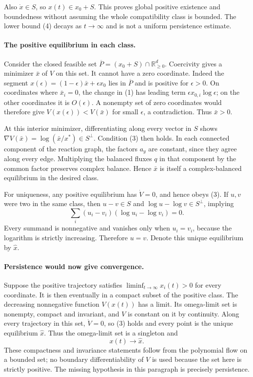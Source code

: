 \documentclass[11pt]{article}
\begin{document}
Also $\dot x\in S$, so $x(t)\in x_0+S$.
This proves global positive existence and boundedness without assuming
the whole compatibility class is bounded. The lower bound (4) decays
as $t\to\infty$ and is not a uniform persistence estimate.

\paragraph{The positive equilibrium in each class.}
Consider the closed feasible set
$\overline P=(x_0+S)\cap\mathbb R_{\ge0}^d$.
Coercivity gives a minimizer $\bar x$ of $V$ on this set.
It cannot have a zero coordinate. Indeed the segment
$x(\epsilon)=(1-\epsilon)\bar x+\epsilon x_0$ lies in $\overline P$
and is positive for $\epsilon>0$. On coordinates where $\bar x_i=0$,
the change in (1) has leading term
$\epsilon x_{0,i}\log\epsilon$; on the other coordinates it is
$O(\epsilon)$. A nonempty set of zero coordinates would therefore give
$V(x(\epsilon))<V(\bar x)$ for small $\epsilon$, a contradiction.
Thus $\bar x>0$.

At this interior minimizer, differentiating along every vector in $S$
shows $\nabla V(\bar x)=\log(\bar x/x^*)\in S^\perp$.
Condition (3) then holds. In each connected component of the reaction
graph, the factors $a_y$ are constant, since they agree along every
edge. Multiplying the balanced fluxes $q$ in that component by the
common factor preserves complex balance. Hence $\bar x$ is itself
a complex-balanced equilibrium in the desired class.

For uniqueness, any positive equilibrium has $\dot V=0$, and hence
obeys (3). If $u,v$ were two in the same class, then
$u-v\in S$ and $\log u-\log v\in S^\perp$, implying
\[
                     \sum_i(u_i-v_i)(\log u_i-\log v_i)=0.
\]
Every summand is nonnegative and vanishes only when $u_i=v_i$,
because the logarithm is strictly increasing. Therefore $u=v$.
Denote this unique equilibrium by $\widehat x$.

\paragraph{Persistence would now give convergence.}
Suppose the positive trajectory satisfies
$\liminf_{t\to\infty}x_i(t)>0$ for every coordinate.
It is then eventually in a compact subset of the positive class.
The decreasing nonnegative function $V(x(t))$ has a limit.
Its omega-limit set is nonempty, compact and invariant, and $V$ is
constant on it by continuity. Along every trajectory in this set,
$\dot V=0$, so (3) holds and every point is the unique equilibrium
$\widehat x$. Thus the omega-limit set is a singleton and
\[
                                  x(t)\longrightarrow\widehat x.
                                                               \tag{5}
\]
These compactness and invariance statements follow from the polynomial
flow on a bounded set; no boundary differentiability of $V$ is used
because the set here is strictly positive. The missing hypothesis in
this paragraph is precisely persistence.
\end{document}

